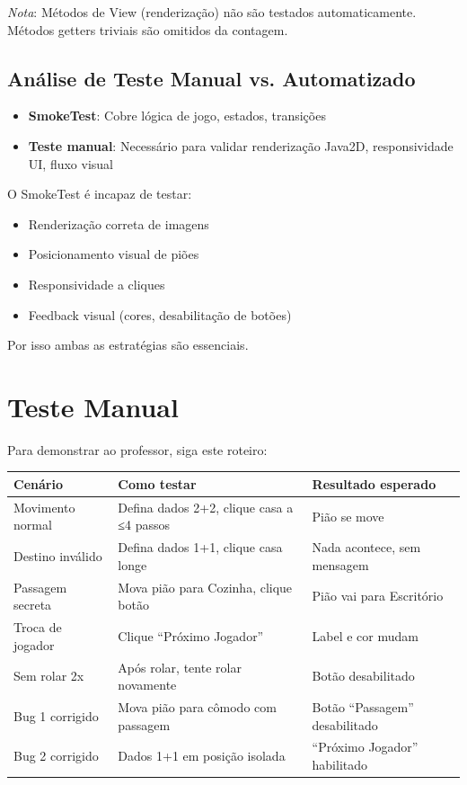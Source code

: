 \documentclass[12pt,a4paper]{report}
\begin{document}
\textit{Nota}: Métodos de View (renderização) não são testados automaticamente. Métodos getters triviais são omitidos da contagem.

\subsection{Análise de Teste Manual vs. Automatizado}

\begin{itemize}
    \item \textbf{SmokeTest}: Cobre lógica de jogo, estados, transições
    \item \textbf{Teste manual}: Necessário para validar renderização Java2D, responsividade UI, fluxo visual
\end{itemize}

O SmokeTest é incapaz de testar:
\begin{itemize}
    \item Renderização correta de imagens
    \item Posicionamento visual de piões
    \item Responsividade a cliques
    \item Feedback visual (cores, desabilitação de botões)
\end{itemize}

Por isso ambas as estratégias são essenciais.

\section{Teste Manual}

Para demonstrar ao professor, siga este roteiro:

\begin{table}[h]
\centering
\begin{tabular}{|l|p{6cm}|p{5cm}|}
\hline
\textbf{Cenário} & \textbf{Como testar} & \textbf{Resultado esperado} \\
\hline
Movimento normal & Defina dados 2+2, clique casa a ≤4 passos & Pião se move \\
\hline
Destino inválido & Defina dados 1+1, clique casa longe & Nada acontece, sem mensagem \\
\hline
Passagem secreta & Mova pião para Cozinha, clique botão & Pião vai para Escritório \\
\hline
Troca de jogador & Clique ``Próximo Jogador'' & Label e cor mudam \\
\hline
Sem rolar 2x & Após rolar, tente rolar novamente & Botão desabilitado \\
\hline
Bug 1 corrigido & Mova pião para cômodo com passagem & Botão ``Passagem'' desabilitado \\
\hline
Bug 2 corrigido & Dados 1+1 em posição isolada & ``Próximo Jogador'' habilitado \\
\hline
\end{tabular}
\end{table}
\end{document}
